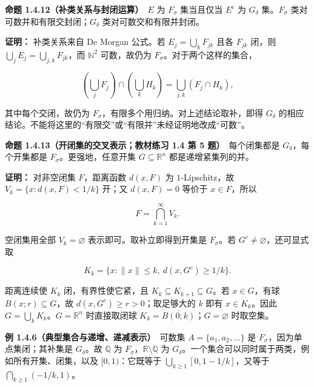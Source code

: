 \documentclass[11pt,a4paper]{article}
\begin{document}
\textbf{命题 1.4.12（补类关系与封闭运算）}　\(E\) 为 \(F_\sigma\)
集当且仅当 \(E^c\) 为 \(G_\delta\) 集。\(F_\sigma\)
类对可数并和有限交封闭；\(G_\delta\) 类对可数交和有限并封闭。

\textbf{证明：} 补类关系来自 De Morgan 公式。若 \(E_j=\bigcup_kF_{jk}\)
且各 \(F_{jk}\) 闭，则 \(\bigcup_jE_j=\bigcup_{j,k}F_{jk}\)，而
\(\mathbb N^2\) 可数，故仍为 \(F_\sigma\)。对于两个这样的集合，

\begin{equation*}
\left(\bigcup_jF_j\right)\cap\left(\bigcup_kH_k\right)
=\bigcup_{j,k}(F_j\cap H_k),
\tag{1.4.12}
\end{equation*}

其中每个交闭，故仍为 \(F_\sigma\)，有限多个用归纳。对上述结论取补，即得
\(G_\delta\)
的相应结论。不能将这里的``有限交''或``有限并''未经证明地改成``可数''。

\textbf{命题 1.4.13（开闭集的交叉表示；教材练习 1.4 第 5
题）}　每个闭集都是 \(G_\delta\)，每个开集都是
\(F_\sigma\)。更强地，任意开集 \(G\subseteq\mathbb R^n\)
都是递增紧集列的并。

\textbf{证明：} 对非空闭集 \(F\)，距离函数 \(d(x,F)\) 为
\(1\)-Lipschitz，故 \(V_k=\{x:d(x,F)<1/k\}\) 开；又 \(d(x,F)=0\) 等价于
\(x\in F\)，所以

\begin{equation*}
F=\bigcap_{k=1}^{\infty}V_k.
\tag{1.4.13}
\end{equation*}

空闭集用全部 \(V_k=\varnothing\) 表示即可。取补立即得到开集是
\(F_\sigma\)。若 \(G^c\ne\varnothing\)，还可显式取

\begin{equation*}
K_k=\{x:\|x\|\leq k,\ d(x,G^c)\geq1/k\}.
\tag{1.4.14}
\end{equation*}

距离连续使 \(K_k\) 闭，有界性使它紧，且
\(K_k\subseteq K_{k+1}\subseteq G\)。若 \(x\in G\)，有球
\(B(x;r)\subseteq G\)，故 \(d(x,G^c)\geq r>0\)；取足够大的 \(k\) 即有
\(x\in K_k\)。因此 \(G=\bigcup_kK_k\)。\(G=\mathbb R^n\) 时直接取闭球
\(K_k=\overline{B(0;k)}\)；\(G=\varnothing\) 时取空集。

\textbf{例 1.4.6（典型集合与递增、递减表示）}　可数集
\(A=\{a_1,a_2,\ldots\}\) 是 \(F_\sigma\)，因为单点集闭；其补集是
\(G_\delta\)。故 \(\mathbb Q\) 为
\(F_\sigma\)，\(\mathbb R\setminus\mathbb Q\) 为
\(G_\delta\)。一个集合可以同时属于两类，例如所有开集、闭集，以及
\([0,1)\)：它既等于 \(\bigcup_{k\geq1}[0,1-1/k]\)，又等于
\(\bigcap_{k\geq1}(-1/k,1)\)。
\end{document}
